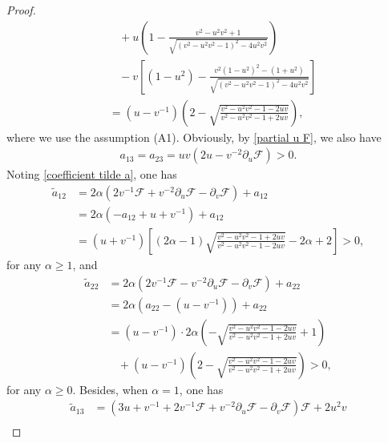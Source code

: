 \documentclass[10pt,leqno]{amsart}
\numberwithin{equation}{section}
\begin{document}
\begin{proof}
\begin{equation*}
\begin{aligned}
			& \ \ \ \ + u \left(   1- \frac{v^2-u^{2}v^2+1 }{\sqrt{(v^2-u^{2}v^2-1)^2 -4u^{2}v^{2} }}  \right) \\
			& \ \ \ \  - v \left[ (1-u^2) - \frac{v^2(1-u^{2})^{2} - (1+u^2) }{\sqrt{(v^2-u^{2}v^2-1)^2 -4u^{2}v^{2} }} \right]   \\
			& = (u-v^{-1}) \left( 2- \sqrt{\frac{v^2-u^{2}v^2-1-2uv}{v^2-u^{2}v^2-1+2uv}} \right),
		\end{aligned}
	\end{equation*}	
	where we use the assumption (A1). Obviously, by \eqref{partial u F}, we also have
	\begin{equation*} 
		\begin{aligned}
			a_{13} = a_{23} = uv(2u-v^{-2}\partial_{u}\mathcal{F})> 0.
		\end{aligned}
	\end{equation*}	
	Noting \eqref{coefficient tilde a}, one has
	\begin{equation} 
		\begin{aligned}
			\tilde{a}_{12} & = 2\alpha (2v^{-1}\mathcal{F}+ v^{-2} \partial_{u}\mathcal{F} - \partial_{v}\mathcal{F}) + {a}_{12} \\
			& = 2\alpha (- a_{12} +u +v^{-1}) + {a}_{12}\\
			& = (u +v^{-1}) \left[  (2 \alpha -1) \sqrt{\frac{v^2-u^{2}v^2-1+2uv}{v^2-u^{2}v^2-1-2uv}} - 2 \alpha+2  \right] > 0,
		\end{aligned}
	\end{equation}	
	for any $ \alpha \geq 1$, and
	\begin{equation}
		\begin{aligned}
			\tilde{a}_{22} & = 2\alpha (2v^{-1}\mathcal{F}- v^{-2} \partial_{u}\mathcal{F} - \partial_{v}\mathcal{F}) + {a}_{22} \\
			& = 2\alpha (a_{22} -(u -v^{-1})) + {a}_{22}\\
			& = (u -v^{-1}) \cdot  2 \alpha \left( -  \sqrt{\frac{v^2-u^{2}v^2-1-2uv}{v^2-u^{2}v^2-1+2uv}} +1 \right) \\
			& \ \ \ \ + (u -v^{-1}) \left(  2 - \sqrt{\frac{v^2-u^{2}v^2-1-2uv}{v^2-u^{2}v^2-1+2uv}} \right) > 0,
		\end{aligned}
	\end{equation}	
	for any $ \alpha \geq 0$. Besides, when $ \alpha =1$, one has
	\begin{equation*} 
		\begin{aligned}
			\tilde{a}_{13} &= ( 3u + v^{-1} + 2v^{-1} \mathcal{F} + v^{-2}  \partial_{u} \mathcal{F} - \partial_{v} \mathcal{F} ) \mathcal{F} + 2u^2 v \\

\end{aligned}
\end{equation*}
\end{proof}
\end{document}
